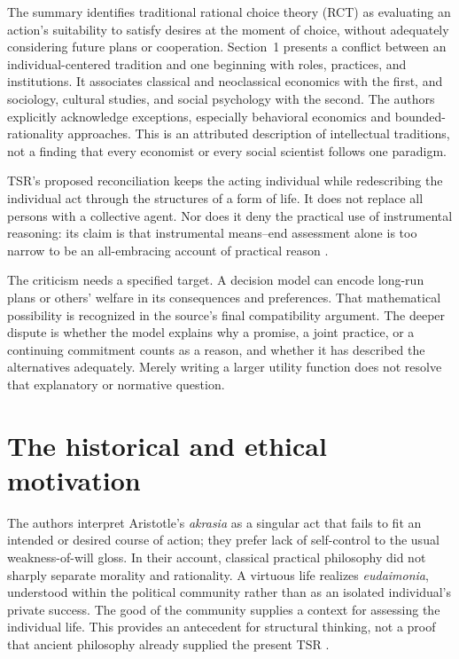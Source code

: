 The summary identifies traditional rational choice theory (RCT) as
evaluating an action's suitability to satisfy desires at the moment of
choice, without adequately considering future plans or cooperation.
Section~1 presents a conflict between an individual-centered tradition
and one beginning with roles, practices, and institutions. It associates
classical and neoclassical economics with the first, and sociology,
cultural studies, and social psychology with the second. The authors
explicitly acknowledge exceptions, especially behavioral economics and
bounded-rationality approaches. This is an attributed description of
intellectual traditions, not a finding that every economist or every
social scientist follows one paradigm.

TSR's proposed reconciliation keeps the acting individual while
redescribing the individual act through the structures of a form of life.
It does not replace all persons with a collective agent. Nor does it
deny the practical use of instrumental reasoning: its claim is that
instrumental means--end assessment alone is too narrow to be an
all-embracing account of practical reason
\parencite[pp.~625--626]{NidaRumelinGutwaldZuber2021}.

The criticism needs a specified target. A decision model can encode
long-run plans or others' welfare in its consequences and preferences.
That mathematical possibility is recognized in the source's final
compatibility argument. The deeper dispute is whether the model explains
why a promise, a joint practice, or a continuing commitment counts as a
reason, and whether it has described the alternatives adequately. Merely
writing a larger utility function does not resolve that explanatory or
normative question.

\section{The historical and ethical motivation}
\label{sec:p11-rat105-ethical-core}

The authors interpret Aristotle's \emph{akrasia} as a singular act that
fails to fit an intended or desired course of action; they prefer lack
of self-control to the usual weakness-of-will gloss. In their account,
classical practical philosophy did not sharply separate morality and
rationality. A virtuous life realizes \emph{eudaimonia}, understood within
the political community rather than as an isolated individual's private
success. The good of the community supplies a context for assessing the
individual life. This provides an antecedent for structural thinking,
not a proof that ancient philosophy already supplied the present TSR
\parencite[p.~625]{NidaRumelinGutwaldZuber2021}.

